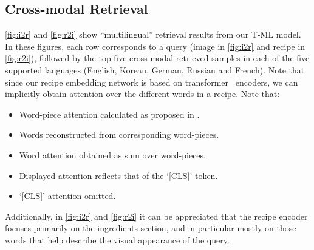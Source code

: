 \documentclass[sigconf,nonacm]{acmart}
\begin{document}
\begin{multicols}{2}

\subsection*{Cross-modal Retrieval}

\autoref{fig:i2r} and \autoref{fig:r2i} show ``multilingual'' retrieval results from our T-ML model. In these figures, each row corresponds to a query (image in \autoref{fig:i2r} and recipe in \autoref{fig:r2i}), followed by the top five cross-modal retrieved samples in each of the five supported languages (English, Korean, German, Russian and French). Note that since our recipe embedding network is based on transformer~\cite{Vaswani2017} encoders, we can implicitly obtain attention over the different words in a recipe. Note that: 
\begin{itemize}
    \item Word-piece attention calculated as proposed in \cite{Abnar2020}.
    \item Words reconstructed from corresponding word-pieces.
    \item Word attention obtained as sum over word-pieces.
    \item Displayed attention reflects that of the `[CLS]' token.
    \item `[CLS]' attention omitted.
\end{itemize}

Additionally, in \autoref{fig:i2r} and \autoref{fig:r2i} it can be appreciated that the recipe encoder focuses primarily on the ingredients section, and in particular mostly on those words that help describe the visual appearance of the query. 



\end{multicols}
\end{document}
